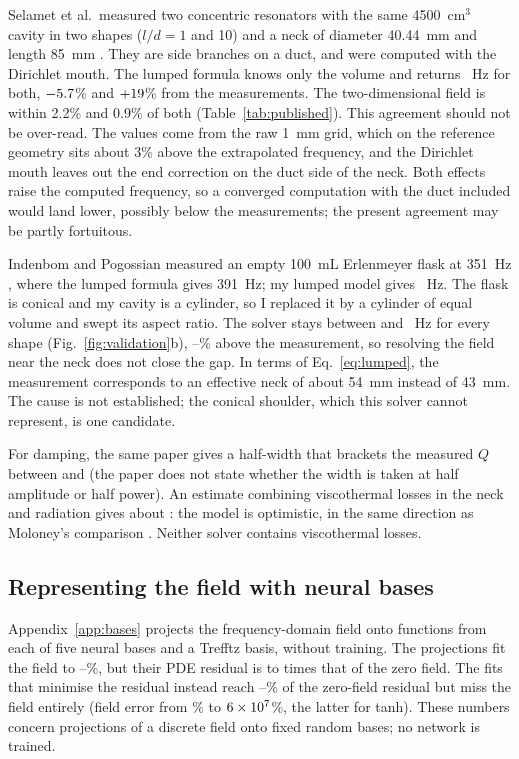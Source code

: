 \documentclass[11pt,a4paper]{article}
\begin{document}
Selamet et al.\ measured two concentric resonators with the same 4500~cm$^3$ cavity in two
shapes ($l/d=1$ and 10) and a neck of diameter 40.44~mm and length 85~mm \citep{selamet1997}.
They are side branches on a duct, and were computed with the Dirichlet mouth. The lumped
formula knows only the volume and returns \selLumped~Hz for both, $-5.7$\% and
$+19$\% from the measurements. The two-dimensional field is within 2.2\% and
0.9\% of both (Table~\ref{tab:published}). This agreement should not be over-read. The
values come from the raw 1~mm grid, which on the reference geometry sits about 3\% above the
extrapolated frequency, and the Dirichlet mouth leaves out the end correction on the duct
side of the neck. Both effects raise the computed frequency, so a converged computation with
the duct included would land lower, possibly below the measurements; the present agreement
may be partly fortuitous.

Indenbom and Pogossian measured an empty 100~mL Erlenmeyer flask at 351~Hz
\citep{indenbom2023}, where the lumped formula gives 391~Hz; my lumped model gives
\flaskLumped~Hz. The flask is conical and my cavity is a cylinder, so I replaced it by a
cylinder of equal volume and swept its aspect ratio. The solver stays between \flaskMin{}
and \flaskMax~Hz for every shape (Fig.~\ref{fig:validation}b), \flaskDevMin--\flaskDevMax\%
above the measurement, so resolving the field near the neck does not close the gap. In terms
of Eq.~\eqref{eq:lumped}, the measurement corresponds to an effective neck of about 54~mm
instead of 43~mm. The cause is not established; the conical shoulder, which this solver
cannot represent, is one candidate.

For damping, the same paper gives a half-width that brackets the measured $Q$ between
\qFlaskLo{} and \qFlaskHi{} (the paper does not state whether the width is taken at half
amplitude or half power). An estimate combining viscothermal losses in the neck and radiation
gives about \qFlaskPred{}: the model is optimistic, in the same direction as Moloney's
comparison \citep{moloney2004}. Neither solver contains viscothermal losses.

\subsection{Representing the field with neural bases}

Appendix~\ref{app:bases} projects the frequency-domain field onto \basesHidden{} functions
from each of five neural bases and a Trefftz basis, without training. The projections fit
the field to \basesErrMin--\basesErrMax\%, but their PDE residual is \basesResMin{} to
\basesResMax{} times that of the zero field. The fits that minimise the residual instead
reach \minResLo--\minResHi\% of the zero-field residual but miss the field entirely (field
error from \minResErrLo\% to $6\times10^{7}$\%, the latter for tanh). These numbers concern projections of a discrete field onto
fixed random bases; no network is trained.
\end{document}
